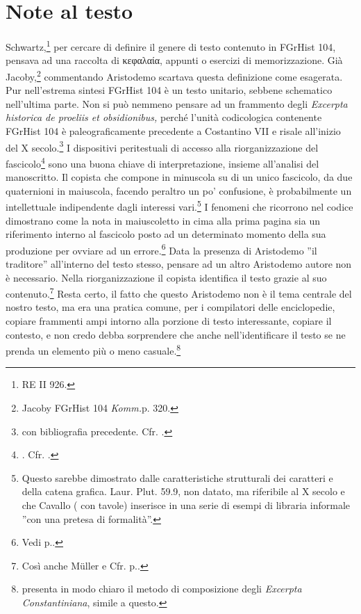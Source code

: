 
\section{Note al testo}\label{bkm:RefHeading690021501267828}
Schwartz,\footnote{RE II 926.} per cercare di definire il genere di
testo contenuto in FGrHist 104,
pensava ad una raccolta di \textgreek{κεφαλαία}, appunti o esercizi di
memorizzazione. Già Jacoby,\footnote{Jacoby FGrHist 104
\textit{Komm.}p. 320.} commentando Aristodemo scartava questa
definizione come esagerata. Pur nell'estrema sintesi FGrHist 104 è
un testo unitario, sebbene schematico nell'ultima parte. Non
si può nemmeno pensare ad un frammento degli
\textit{Excerpta historica de proeliis et
obsidionibus,} perché l'unità codicologica
contenente FGrHist 104 è paleograficamente precedente a Costantino
VII e risale all'inizio del X
secolo.\footnote{\cite[349]{Dain1967} con bibliografia
precedente. Cfr. \pageref{bkm:RefHeading707961501267828}.} 
I dispositivi peritestuali di
accesso alla riorganizzazione del
fascicolo\footnote{\cite[94-5]{Maniaci2002}. Cfr. \pageref{bkm:RefHeading703691501267828}.} sono
una buona chiave di interpretazione, insieme all'analisi del
manoscritto. \label{ref:maiuscolaminuscola} Il
copista che compone in minuscola su di un unico fascicolo, da due quaternioni
in maiuscola, facendo peraltro un po' confusione, è
probabilmente un intellettuale indipendente dagli interessi
vari.\footnote{Questo sarebbe dimostrato dalle caratteristiche strutturali
dei caratteri e della catena grafica. Laur. Plut. 59.9, non datato, ma
riferibile al X secolo e che Cavallo (\cite[222]{Cavallo2000} con tavole) inserisce in una
serie di esempi di libraria informale ''con una pretesa di
formalità''.} I fenomeni che ricorrono nel codice
dimostrano come la nota in maiuscoletto in cima alla prima pagina sia un
riferimento interno al fascicolo posto ad un determinato momento della sua
produzione per ovviare ad un errore.\footnote{Vedi
p.\pageref{bkm:RefHeading704631501267828}.} Data la
presenza di Aristodemo ''il traditore'' all'interno del testo
stesso, pensare ad un altro Aristodemo autore non è necessario. Nella
riorganizzazione il copista identifica il testo grazie al suo
contenuto.\footnote{Così anche Müller e Cfr.
p.\pageref{bkm:RefHeading703691501267828}.}
Resta certo, il fatto che questo Aristodemo non è il tema centrale del nostro testo, ma era una pratica comune, per i compilatori delle enciclopedie, copiare frammenti ampi intorno alla
porzione di testo interessante, copiare il contesto, e non credo debba sorprendere che anche nell'identificare il testo se ne prenda un elemento più o meno casuale.\footnote{\cite[XXV-XXXVI]{Cohen-Skalli2012} presenta in modo chiaro il metodo di composizione degli
\textit{Excerpta Constantiniana}, simile a questo.}
